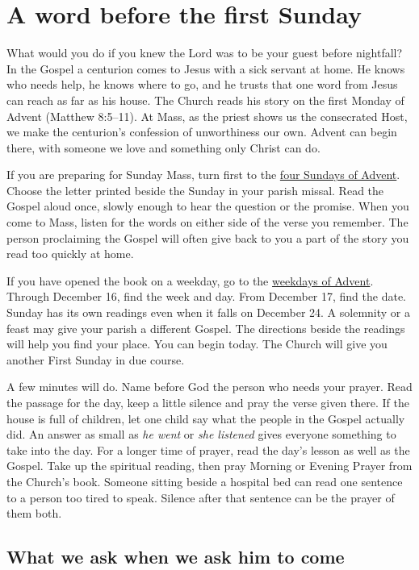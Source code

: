 \section{A word before the first Sunday}

What would you do if you knew the Lord was to be your guest before nightfall? In the Gospel a centurion comes to Jesus with a sick servant at home. He knows who needs help, he knows where to go, and he trusts that one word from Jesus can reach as far as his house. The Church reads his story on the first Monday of Advent (Matthew 8:5--11). At Mass, as the priest shows us the consecrated Host, we make the centurion's confession of unworthiness our own. Advent can begin there, with someone we love and something only Christ can do.

If you are preparing for Sunday Mass, turn first to the \hyperref[sec:pc-advent-sundays]{four Sundays of Advent}. Choose the letter printed beside the Sunday in your parish missal. Read the Gospel aloud once, slowly enough to hear the question or the promise. When you come to Mass, listen for the words on either side of the verse you remember. The person proclaiming the Gospel will often give back to you a part of the story you read too quickly at home.

If you have opened the book on a weekday, go to the \hyperref[sec:pc-advent-weekdays]{weekdays of Advent}. Through December 16, find the week and day. From December 17, find the date. Sunday has its own readings even when it falls on December 24. A solemnity or a feast may give your parish a different Gospel. The directions beside the readings will help you find your place. You can begin today. The Church will give you another First Sunday in due course.

A few minutes will do. Name before God the person who needs your prayer. Read the passage for the day, keep a little silence and pray the verse given there. If the house is full of children, let one child say what the people in the Gospel actually did. An answer as small as \emph{he went} or \emph{she listened} gives everyone something to take into the day. For a longer time of prayer, read the day's lesson as well as the Gospel. Take up the spiritual reading, then pray Morning or Evening Prayer from the Church's book. Someone sitting beside a hospital bed can read one sentence to a person too tired to speak. Silence after that sentence can be the prayer of them both.

\subsection{What we ask when we ask him to come}

